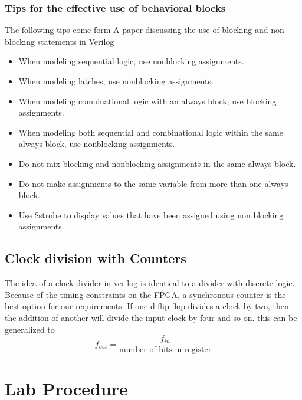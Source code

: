     \subsubsection{Tips for the effective use of behavioral blocks}
      The following tips come form A paper discussing the use of blocking and non-blocking statements in Verilog 
      \begin{itemize}
        \item When modeling sequential logic, use nonblocking assignments.
        \item When modeling latches, use nonblocking assignments.
        \item When modeling combinational logic with an always block, use blocking assignments.
        \item When modeling both sequential and combinational logic within the same always block, use nonblocking assignments.
        \item Do not mix blocking and nonblocking assignments in the same always block.
        \item Do not make assignments to the same variable from more than one always block.
        \item Use \$strobe to display values that have been assigned using non blocking assignments.
      \end{itemize}

  \subsection{Clock division with Counters}
    The idea of a clock divider in verilog is identical to a divider with discrete logic. Because of the timing constraints on the FPGA, a synchronous counter is the best option for our requirements. If one d flip-flop divides a clock by two, then the addition of another will divide the input clock by four and so on. this can be generalized to $$f_{out}=\frac{f_{in}}{\text{number of bits in register}}$$
    
\section{Lab Procedure}
